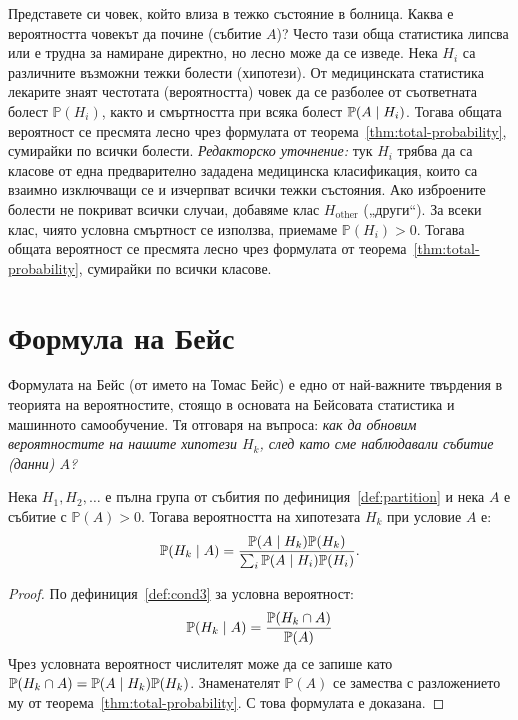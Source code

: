 \begin{example}\label{ex:03-3}
Представете си човек, който влиза в тежко състояние в болница. Каква е вероятността човекът да почине (събитие $A$)? Често тази обща статистика липсва или е трудна за намиране директно, но лесно може да се изведе. Нека $H_i$ са различните възможни тежки болести (хипотези). От медицинската статистика лекарите знаят честотата (вероятността) човек да се разболее от съответната болест $\mathbb{P}(H_i)$, както и смъртността при всяка болест $\mathbb{P}(A \mid H_i)$. Тогава общата вероятност се пресмята лесно чрез формулата от теорема~\ref{thm:total-probability}, сумирайки по всички болести.
\emph{Редакторско уточнение:} тук $H_i$ трябва да са класове от една предварително зададена
медицинска класификация, които са взаимно изключващи се и изчерпват всички тежки състояния.
Ако изброените болести не покриват всички случаи, добавяме клас $H_{\mathrm{other}}$ („други“).
За всеки клас, чиято условна смъртност се използва, приемаме $\mathbb{P}(H_i)>0$.
Тогава общата вероятност се пресмята лесно чрез формулата от теорема~\ref{thm:total-probability}, сумирайки по всички класове.

\end{example}

\section{Формула на Бейс}

Формулата на Бейс (от името на Томас Бейс) е едно от най-важните твърдения в теорията на вероятностите, стоящо в основата на Бейсовата статистика и машинното самообучение. Тя отговаря на въпроса: \emph{как да обновим вероятностите на нашите хипотези $H_k$, след като сме наблюдавали събитие (данни) $A$?}

\begin{keythm}\label{thm:bayes}
Нека $H_1, H_2, \dots$ е пълна група от събития по дефиниция~\ref{def:partition} и нека $A$ е събитие с $\mathbb{P}(A) > 0$. Тогава вероятността на хипотезата $H_k$ при условие $A$ е:
\[
\mathbb{P}(H_k \mid A) = \frac{\mathbb{P}(A \mid H_k)\mathbb{P}(H_k)}{\sum_{i} \mathbb{P}(A \mid H_i)\mathbb{P}(H_i)} .
\]
\end{keythm}

\begin{proof}
По дефиниция~\ref{def:cond3} за условна вероятност:
\[
\mathbb{P}(H_k \mid A) = \frac{\mathbb{P}(H_k \cap A)}{\mathbb{P}(A)}
\]
Чрез условната вероятност числителят може да се запише като $\mathbb{P}(H_k \cap A) = \mathbb{P}(A \mid H_k)\mathbb{P}(H_k)$. Знаменателят $\mathbb{P}(A)$ се замества с разложението му от теорема~\ref{thm:total-probability}. С това формулата е доказана.
\end{proof}

